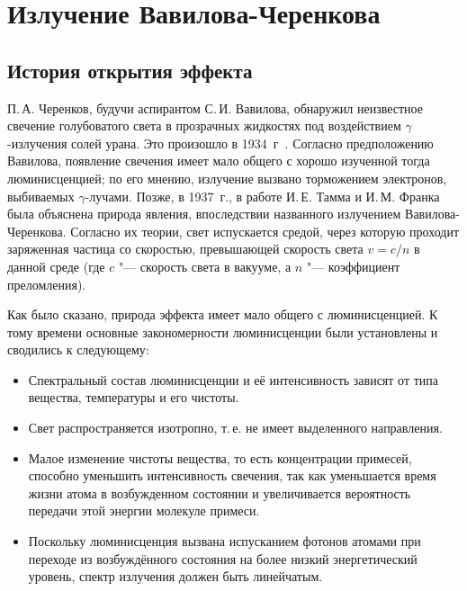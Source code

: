 \documentclass[12pt,a4paper]{report} %
\begin{document}
\chapter{Излучение Вавилова-Черенкова}
\section{История открытия эффекта}

П.\,А. Черенков, будучи аспирантом С.\,И. Вавилова, обнаружил неизвестное свечение голубоватого света в прозрачных жидкостях под воздействием $\gamma$-излучения солей урана. Это произошло в 1934~г~\cite{Cerenkov}. Согласно предположению Вавилова, появление свечения имеет мало общего с хорошо изученной тогда люминисценцией; по его мнению, излучение вызвано торможением электронов, выбиваемых $\gamma$-лучами. Позже, в 1937~г., в работе И.\,Е. Тамма и И.\,М. Франка~\cite{Tamm} была объяснена природа явления,  впоследствии названного излучением Вавилова-Черенкова. Согласно их теории, свет испускается средой, через которую проходит заряженная частица со скоростью, превышающей скорость света $v=c/n$ в данной среде (где $c$ "--- скорость света в вакууме, а $n$ "--- коэффициент преломления). 

Как было сказано, природа эффекта имеет мало общего с люминисценцией. К тому времени основные закономерности люминисценции были установлены и сводились к следующему:
\begin{itemize}
    \item Спектральный состав люминисценции и её интенсивность зависят от типа вещества, температуры и его чистоты.
    \item Свет распространяется изотропно, т.\,е. не имеет выделенного направления.
    \item Малое изменение чистоты вещества, то есть концентрации примесей, способно уменьшить интенсивность свечения, так как уменьшается время жизни атома в возбужденном состоянии и увеличивается вероятность передачи этой энергии молекуле примеси.
    \item Поскольку люминисценция вызвана испусканием фотонов атомами при переходе из возбуждённого состояния на более низкий энергетический уровень, спектр излучения должен быть линейчатым.
\end{itemize}
\end{document}

